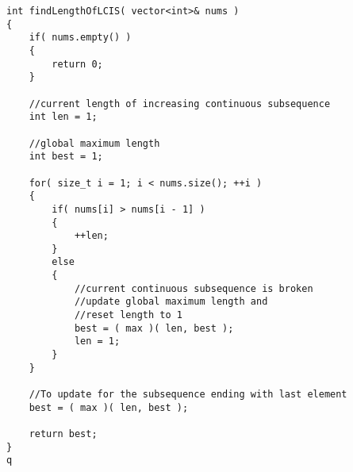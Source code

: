 \setcounter{lstlisting}{0}
\begin{lstlisting}[style=customc, caption={Sliding Window}]
int findLengthOfLCIS( vector<int>& nums )
{
    if( nums.empty() )
    {
        return 0;
    }

    //current length of increasing continuous subsequence
    int len = 1;

    //global maximum length
    int best = 1;

    for( size_t i = 1; i < nums.size(); ++i )
    {
        if( nums[i] > nums[i - 1] )
        {
            ++len;
        }
        else
        {
            //current continuous subsequence is broken
            //update global maximum length and
            //reset length to 1
            best = ( max )( len, best );
            len = 1;
        }
    }

    //To update for the subsequence ending with last element
    best = ( max )( len, best );

    return best;
}
q
\end{lstlisting}
